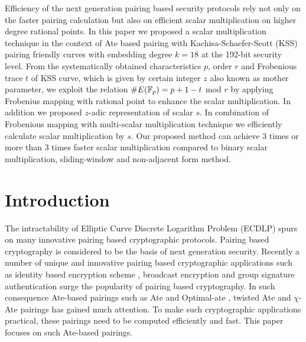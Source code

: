 Efficiency of the next generation pairing based security protocols rely not only on the faster pairing calculation but also on efficient scalar multiplication on higher degree rational points. 
In this paper we proposed a scalar multiplication technique in the context of Ate based pairing with  Kachisa-Schaefer-Scott (KSS) pairing friendly curves with embedding degree $k = 18$ at the 192-bit security level.
From the systematically obtained characteristics $p$, order $r$ and Frobenious trace $t$ of KSS curve, which is given by certain integer $z$ also known as mother parameter, we exploit the relation $\#E({\mathbb{F}}_{p}) = p+1-t$ mod $r$  by applying Frobenius mapping with rational point to enhance the scalar multiplication.
In addition we proposed $z$-adic representation of scalar $s$.
In combination of Frobenious mapping with multi-scalar multiplication technique we efficiently calculate scalar multiplication by $s$.
Our proposed method can achieve 3 times or more than 3 times faster scalar multiplication compared to binary scalar multiplication, sliding-window and non-adjacent form method.


\section{Introduction}
The intractability of Elliptic Curve Discrete Logarithm Problem (ECDLP) spurs on many innovative pairing based cryptographic protocols.
Pairing based cryptography is considered to be the basis of next generation security. 
Recently a number of unique and innovative pairing based cryptographic applications such as identity based encryption scheme \cite{C:BonFra01}, broadcast encryption \cite{boradcast} and group signature authentication \cite{group_sign_1} surge the popularity of pairing based cryptography. 
In such consequence Ate-based pairings such as Ate \cite{ate} and Optimal-ate \cite{op_ate_p}, twisted Ate  \cite{twisted_ate} and $\chi$-Ate \cite{PAIRING:NASKM08} pairings has gained much attention. 
To make such cryptographic applications practical, these pairings need to be computed efficiently and fast. 
This paper focuses on such  Ate-based pairings. 

